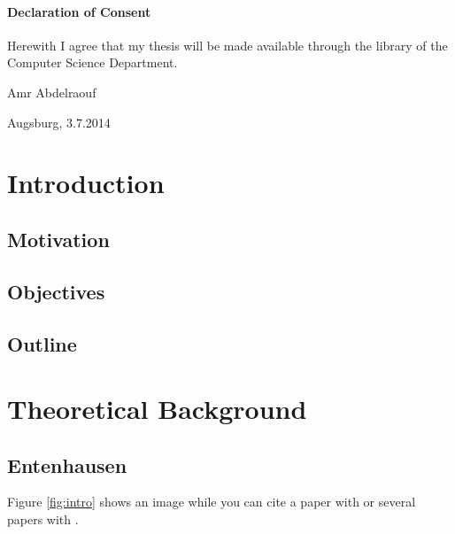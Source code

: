 \documentclass[12pt, a4paper, fleqn]{memoir}%
\begin{document}
\subsubsection*{\LARGE Declaration of Consent}
Herewith I agree that my thesis will be made available through the library of the Computer Science Department.
\vfill
\begin{flushleft}
Amr Abdelraouf
\end{flushleft}  
\begin{flushright}
Augsburg, 3.7.2014 
\end{flushright}
\vfill

\cleardoublepage
\rmfamily
\normalfont
{}
\pagestyle{headings}
\tableofcontents


\mainmatter

\chapter{Introduction}
\label{chap:Introduction}

\section{Motivation}
\label{sec:Motivation}

\section{Objectives}
\label{sec:Objectives}

\section{Outline}
\label{sec:Outline}

\chapter{Theoretical Background}
\label{chap:TheoreticalBackground}

\section{Entenhausen}
\label{sec:Entenhausen}
Figure \ref{fig:intro} shows an image while you can cite a paper with \cite{AmirPnueli1985} or several papers with \cite{ThomasRist2004, Rist2002}.
\end{document}
